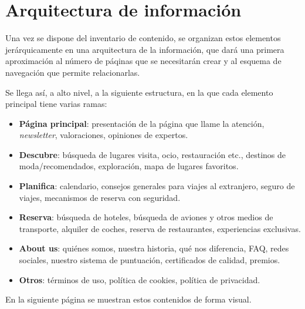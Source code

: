 \documentclass[11pt, a4paper]{book}
\begin{document}
	\section{Arquitectura de información}
	Una vez se dispone del inventario de contenido, se organizan estos elementos jerárquicamente en una arquitectura de la información, que dará una primera aproximación al número de páqinas que se necesitarán crear y al esquema de navegación que permite relacionarlas. 
	
	Se llega así, a alto nivel, a la siguiente estructura, en la que cada elemento principal tiene varias ramas:
	
	\begin{itemize}
		\item \textbf{Página principal}: presentación de la página que llame la atención, \textit{newsletter}, valoraciones, opiniones de expertos.
		\item \textbf{Descubre}: búsqueda de lugares visita, ocio, restauración etc., destinos de moda/recomendados, exploración, mapa de lugares favoritos.
		\item \textbf{Planifica}: calendario, consejos generales para viajes al extranjero, seguro de viajes, mecanismos de reserva con seguridad.
		\item \textbf{Reserva}: búsqueda de hoteles, búsqueda de aviones y otros medios de transporte, alquiler de coches, reserva de restaurantes, experiencias exclusivas.
		\item \textbf{About us}: quiénes somos, nuestra historia, qué nos diferencia, FAQ, redes sociales, nuestro sistema de puntuación, certificados de calidad, premios.
		\item \textbf{Otros}: términos de uso, política de cookies, política de privacidad.
	\end{itemize}

	En la siguiente página se muestran estos contenidos de forma visual.

	\newpage
\end{document}
